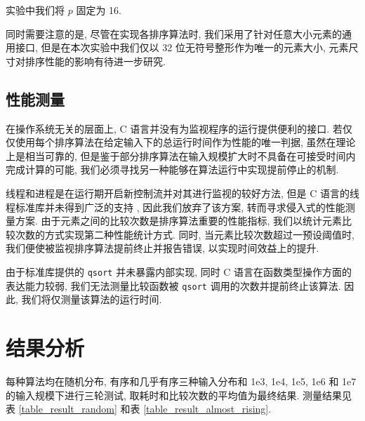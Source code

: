 \documentclass[12pt]{article}
\begin{document}
实验中我们将 $p$ 固定为 16.

同时需要注意的是, 尽管在实现各排序算法时, 我们采用了针对任意大小元素的通用接口, 但是在本次实验中我们仅以 32 位无符号整形作为唯一的元素大小, 元素尺寸对排序性能的影响有待进一步研究.

\subsection{性能测量}

在操作系统无关的层面上, C 语言并没有为监视程序的运行提供便利的接口. 若仅仅使用每个排序算法在给定输入下的总运行时间作为性能的唯一判据, 虽然在理论上是相当可靠的, 但是鉴于部分排序算法在输入规模扩大时不具备在可接受时间内完成计算的可能, 我们必须寻找另一种能够在算法运行中实现提前停止的机制.

线程和进程是在运行期开启新控制流并对其进行监视的较好方法, 但是 C 语言的线程标准库并未得到广泛的支持 \cite{bib_msvc_threads}, 因此我们放弃了该方案, 转而寻求侵入式的性能测量方案. 由于元素之间的比较次数是排序算法重要的性能指标, 我们以统计元素比较次数的方式实现第二种性能统计方式. 同时, 当元素比较次数超过一预设阈值时, 我们便使被监视排序算法提前终止并报告错误, 以实现时间效益上的提升.

由于标准库提供的 \texttt{qsort} 并未暴露内部实现, 同时 C 语言在函数类型操作方面的表达能力较弱, 我们无法测量比较函数被 \texttt{qsort} 调用的次数并提前终止该算法. 因此, 我们将仅测量该算法的运行时间.

\section{结果分析}

每种算法均在随机分布, 有序和几乎有序三种输入分布和 1e3, 1e4, 1e5, 1e6 和 1e7 的输入规模下进行三轮测试, 取耗时和比较次数的平均值为最终结果. 测量结果见表 \ref{table_result_random} 和表 \ref{table_result_almost_rising}.
\end{document}
